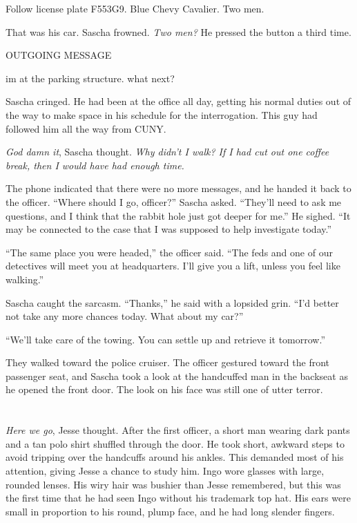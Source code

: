 \documentclass[12pt]{book}
\begin{document}
\indent Follow license plate F553G9. Blue Chevy Cavalier. Two men.
	
	
That was his car.  Sascha frowned.  \emph{Two men?}  He pressed the button a third time.


\indent OUTGOING MESSAGE
	
\indent im at the parking structure. what next?
	

Sascha cringed.  He had been at the office all day, getting his normal duties out of the way to make space in his schedule for the interrogation.  This guy had followed him all the way from CUNY.

\emph{God damn it}, Sascha thought.  \emph{Why didn't I walk?  If I had cut out one coffee break, then I would have had enough time.}

The phone indicated that there were no more messages, and he handed it back to the officer.  ``Where should I go, officer?'' Sascha asked.  ``They'll need to ask me questions, and I think that the rabbit hole just got deeper for me.''  He sighed.   ``It may be connected to the case that I was supposed to help investigate today.''

``The same place you were headed,'' the officer said.  ``The feds and one of our detectives will meet you at headquarters.  I'll give you a lift, unless you feel like walking.''

Sascha caught the sarcasm.  ``Thanks,'' he said with a lopsided grin.  ``I'd better not take any more chances today.  What about my car?''

``We'll take care of the towing.  You can settle up and retrieve it tomorrow.''

They walked toward the police cruiser.  The officer gestured toward the front passenger seat, and Sascha took a look at the handcuffed man in the backseat as he opened the front door.  The look on his face was still one of utter terror.

\chapter{}

\emph{Here we go}, Jesse thought.  After the first officer, a short man wearing dark pants and a tan polo shirt shuffled through the door.  He took short, awkward steps to avoid tripping over the handcuffs around his ankles.  This demanded most of his attention, giving Jesse a chance to study him.  Ingo wore glasses with large, rounded lenses.  His wiry hair was bushier than Jesse remembered, but this was the first time that he had seen Ingo without his trademark top hat.  His ears were small in proportion to his round, plump face, and he had long slender fingers.
\end{document}

